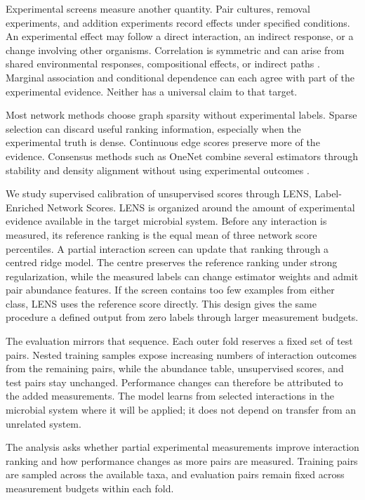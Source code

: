 \documentclass[11pt]{article}
\begin{document}
Experimental screens measure another quantity.
Pair cultures, removal experiments, and addition experiments record effects under specified conditions.
An experimental effect may follow a direct interaction, an indirect response, or a change involving other organisms.
Correlation is symmetric and can arise from shared environmental responses, compositional effects, or indirect paths \citep{carr2019correlation}.
Marginal association and conditional dependence can each agree with part of the experimental evidence.
Neither has a universal claim to that target.

Most network methods choose graph sparsity without experimental labels.
Sparse selection can discard useful ranking information, especially when the experimental truth is dense.
Continuous edge scores preserve more of the evidence.
Consensus methods such as OneNet combine several estimators through stability and density alignment without using experimental outcomes \citep{champion2024onenet}.

We study supervised calibration of unsupervised scores through LENS, Label-Enriched Network Scores.
LENS is organized around the amount of experimental evidence available in the target microbial system.
Before any interaction is measured, its reference ranking is the equal mean of three network score percentiles.
A partial interaction screen can update that ranking through a centred ridge model.
The centre preserves the reference ranking under strong regularization, while the measured labels can change estimator weights and admit pair abundance features.
If the screen contains too few examples from either class, LENS uses the reference score directly.
This design gives the same procedure a defined output from zero labels through larger measurement budgets.

The evaluation mirrors that sequence.
Each outer fold reserves a fixed set of test pairs.
Nested training samples expose increasing numbers of interaction outcomes from the remaining pairs, while the abundance table, unsupervised scores, and test pairs stay unchanged.
Performance changes can therefore be attributed to the added measurements.
The model learns from selected interactions in the microbial system where it will be applied; it does not depend on transfer from an unrelated system.

The analysis asks whether partial experimental measurements improve interaction ranking and how performance changes as more pairs are measured.
Training pairs are sampled across the available taxa, and evaluation pairs remain fixed across measurement budgets within each fold.
\end{document}
